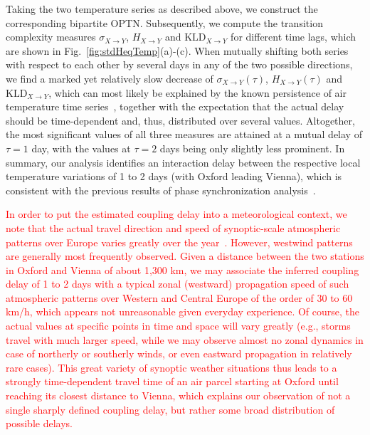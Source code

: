 \documentclass[12pt,aip,cha,reprint,nofootinbib]{revtex4-1}
\begin{document}
Taking the two temperature series as described above, we construct the corresponding bipartite OPTN. Subsequently, we compute the transition complexity measures $\sigma_{X\to Y}$, $H_{X\to Y}$ and $\text{KLD}_{X\to Y}$ for different time lags, which are shown in Fig.~\ref{fig:stdHeqTemp}(a)-(c). When mutually shifting both series with respect to each other by several days in any of the two possible directions, we find a marked yet relatively slow decrease of $\sigma_{X\to Y} (\tau)$, $H_{X\to Y} (\tau)$ and $\text{KLD}_{X\to Y}$, which can most likely be explained by the known persistence of air temperature time series~{\color{red}\cite{Bunde1998}}, together with the expectation that the actual delay should be time-dependent and, thus, distributed over several values. Altogether, the most significant values of all three measures are attained at a mutual delay of $\tau=1$ day, with the values at $\tau=2$ days being only slightly less prominent. In summary, our analysis identifies an interaction delay between the respective local temperature variations of 1 to 2 days (with Oxford leading Vienna), which is consistent with the previous results of phase synchronization analysis~\cite{Rybski2003}. 

\textcolor{red}{In order to put the estimated coupling delay into a meteorological context, we note that the actual travel direction and speed of synoptic-scale atmospheric patterns over Europe varies greatly over the year~\cite{Esteban2006}. However, westwind patterns are generally most frequently observed. Given a distance between the two stations in Oxford and Vienna of about 1,300 km, we may associate the inferred coupling delay of 1 to 2 days with a typical zonal (westward) propagation speed of such atmospheric patterns over Western and Central Europe of the order of 30 to 60 km/h, which appears not unreasonable given everyday experience. Of course, the actual values at specific points in time and space will vary greatly (e.g., storms travel with much larger speed, while we may observe almost no zonal dynamics in case of northerly or southerly winds, or even eastward propagation in relatively rare cases). This great variety of synoptic weather situations thus leads to a strongly time-dependent travel time of an air parcel starting at Oxford until reaching its closest distance to Vienna, which explains our observation of not a single sharply defined coupling delay, but rather some broad distribution of possible delays.}
\end{document}

